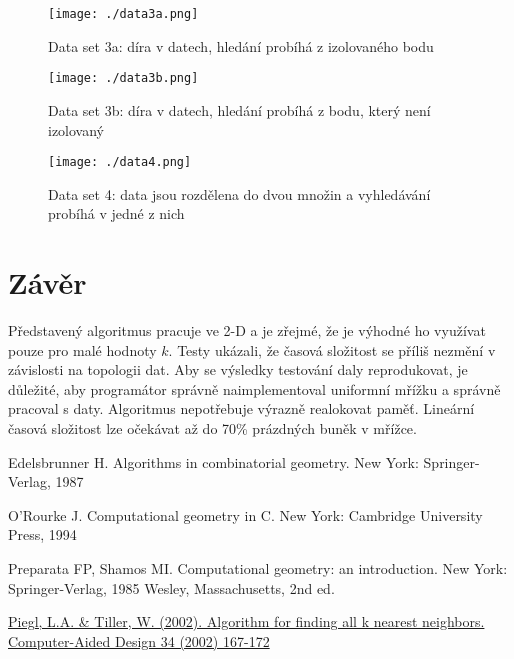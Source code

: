 \documentclass[
12pt,
a4paper,
pdftex,
czech,
titlepage
]{report}
\begin{document}
\begin{figure}[htp]
\centering
\texttt{[image: ./data3a.png]}
\captionsetup{labelformat=empty}
\caption{Data set 3a: díra v datech, hledání probíhá z izolovaného bodu \cite{base}}
\end{figure}

\begin{figure}[htp]
\centering
\texttt{[image: ./data3b.png]}
\captionsetup{labelformat=empty}
\caption{Data set 3b: díra v datech, hledání probíhá z bodu, který není izolovaný \cite{base}}
\end{figure}


\begin{figure}[htp]
\centering
\texttt{[image: ./data4.png]}
\captionsetup{labelformat=empty}
\caption{Data set 4: data jsou rozdělena do dvou množin a vyhledávání probíhá v jedné z nich \cite{base}}
\end{figure}

\hypertarget{zuxe1vux11br}{%
\chapter{Závěr}\label{zuxe1vux11br}}

Představený algoritmus pracuje ve 2-D a je zřejmé, že je výhodné ho využívat pouze pro malé hodnoty \(k\).
Testy ukázali, že časová složitost se příliš nezmění v závislosti na topologii dat. Aby se výsledky testování daly reprodukovat,
je důležité, aby programátor správně naimplementoval uniformní mřížku a správně pracoval s daty. Algoritmus nepotřebuje výrazně 
realokovat paměť. Lineární časová složitost lze očekávat až do 70\% prázdných buněk v mřížce.

\begin{thebibliography}{9}
Edelsbrunner H. Algorithms in combinatorial geometry. New York: Springer-Verlag, 1987

O'Rourke J. Computational geometry in C. New York: Cambridge University Press, 1994

Preparata FP, Shamos MI. Computational geometry: an introduction. New York: Springer-Verlag, 1985
Wesley, Massachusetts, 2nd ed.

\href{https://www.sciencedirect.com/science/article/pii/S001044850000141X}{Piegl, L.A. \& Tiller, W. (2002). Algorithm for finding all k nearest neighbors. Computer-Aided Design 34 (2002) 167-172}

\end{thebibliography}
\end{document}
